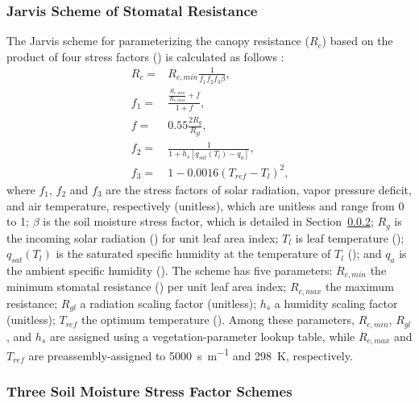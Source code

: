 \documentclass[essd, manuscript]{copernicus}
\let\unit\undefined
\begin{document}
\subsubsection{Jarvis Scheme of Stomatal Resistance}\label{sec:data:noahmp:jarvis}

The Jarvis scheme for parameterizing the canopy resistance (\(R_{c}\)) based on the product of four stress factors (\unit{s.m^{-1}}) is calculated as follows \citep{chen1996JGRA, sellers1996JCa, jarvis1976PTRSLB}:
\begin{align}
  R_c =   & R_{c,min} \frac{1}{f_{1} f_{2} f_{3} \beta}
  \text{,} \\
  f_{1} = & \frac{\frac{R_{c,min}}{R_{c,max}}+f}{1+f}
  \text{,} \\
  f =     & 0.55 \frac{2 R_{g}}{R_{gl}}
  \text{,} \\
  f_{2} = & \frac{1}{1+h_s[q_{sat}(T_{l})-q_{a}]}
  \text{,} \\
  f_{3} = & 1- 0.0016 (T_{ref} - T_l)^2
  \text{,}
\end{align}
where \(f_{1}\), \(f_{2}\) and \(f_{3}\) are the stress factors of solar radiation, vapor pressure deficit, and air temperature, respectively (unitless), which are unitless and range from 0 to 1; \(\beta\) is the soil moisture stress factor, which is detailed in Section~\ref{sec:data:noahmp:beta}; \(R_{g}\) is the incoming solar radiation (\unit{W.m^{-2}}) for unit leaf area index; \(T_{l}\) is leaf temperature (\unit{K}); \(q_{sat}(T_{l})\) is the saturated specific humidity at the temperature of \(T_{l}\) (\unit{kg.kg^{-1}}); and \(q_{a}\) is the ambient specific humidity (\unit{kg.kg^{-1}}). The scheme has five parameters: \(R_{c,min}\) the minimum stomatal resistance (\unit{s.m^{-1}}) per unit leaf area index; \(R_{c,max}\) the maximum resistance; \(R_{gl}\) a radiation scaling factor (unitless); \(h_{s}\) a humidity scaling factor (unitless); \(T_{ref}\) the optimum temperature (\unit{K}). Among these parameters, \(R_{c,min}\), \(R_{gl}\), and \(h_{s}\) are assigned using a vegetation-parameter lookup table, while \(R_{c,max}\) and \(T_{ref}\) are preassembly-assigned to \qty{5000}{s.m^{-1}} and \qty{298}{K}, respectively.

\subsubsection{Three Soil Moisture Stress Factor Schemes}\label{sec:data:noahmp:beta}
\end{document}
